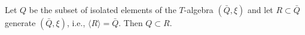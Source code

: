 Let $Q$ be the subset of isolated elements of the $T$-algebra $(\bar{Q}, \xi)$ and let $R \subset \bar{Q}$ generate $(\bar{Q}, \xi)$, i.e., $\langle R \rangle = \bar{Q}$. Then $Q \subset R$.
